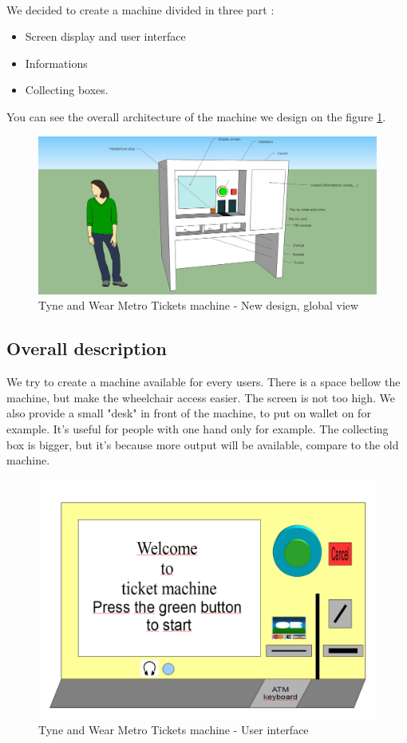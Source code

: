 \documentclass[a4paper,12pt]{article} %
\begin{document}
\paragraph{}We decided to create a machine divided in three part : 
\begin{itemize}
\item Screen display and user interface
\item Informations
\item Collecting boxes.
\end{itemize}
You can see the overall architecture of the machine we design on the figure \ref{new}.
\begin{figure}[h!]
\hspace{-3.5cm}
\includegraphics[width=1.5\linewidth]{ID.png}
\caption{\label{new} Tyne and Wear Metro Tickets machine - New design, global view}
\end{figure}
\subsection{Overall description}
We try to create a machine available for every users. There is a space bellow the machine, but make the wheelchair access easier. The screen is not too high. We also provide a small "desk" in front of the machine, to put on wallet on for example. It's useful for people with one hand only for example.  The collecting box is bigger, but it's because more output will be available, compare to the old machine.
\begin{figure}[h!]
\includegraphics[width=1\linewidth]{interaction1.png}
\caption{\label{userInterface} Tyne and Wear Metro Tickets machine - User interface}
\end{figure}
\end{document}
